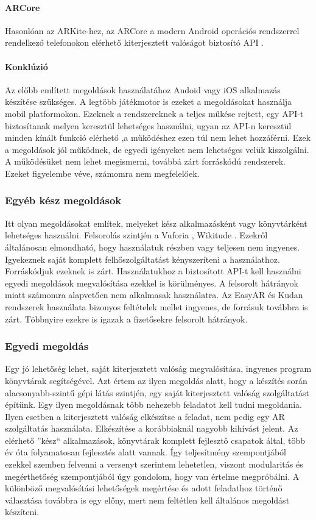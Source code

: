 \documentclass[12pt,a4paper,oneside]{report} %
\begin{document}
\paragraph{ARCore}
Hasonlóan az ARKite-hez, az ARCore a modern Android operációs rendszerrel rendelkező telefonokon elérhető kiterjesztett valóságot biztosító API \cite{arcore}.
\paragraph{Konklúzió}
Az előbb említett megoldások használatához Andoid vagy iOS alkalmazás készítése szükséges. A legtöbb játékmotor is ezeket a megoldásokat használja mobil platformokon. Ezeknek a rendszereknek a teljes műkése rejtett, egy API-t biztosítanak melyen keresztül lehetséges használni, ugyan az API-n keresztül minden kínált funkció elérhető ,a működéshez ezen túl nem lehet hozzáférni. Ezek a megoldások jól működnek, de egyedi igényeket nem lehetséges velük kiszolgálni. A működésüket nem lehet megismerni, továbbá zárt forráskódú rendszerek. Ezeket figyelembe véve, számomra nem megfelelőek.
\subsubsection{Egyéb kész megoldások}
Itt olyan megoldásokat említek, melyeket kész alkalmazásként vagy könyvtárként lehetséges használni. Felsorolás szintjén a Vuforia \cite{vuforia}, Wikitude \cite{wikitude}.
Ezekről általánosan elmondható, hogy használatuk részben vagy teljesen nem ingyenes. Igyekeznek saját komplett felhőszolgáltatást kényszeríteni a használathoz. Forráskódjuk ezeknek is zárt. Használatukhoz a biztosított API-t kell használni egyedi megoldások megvalósítása ezekkel is körülményes.  A felsorolt hátrányok miatt számomra alapvetően nem alkalmasak használatra.
Az EasyAR \cite{ezar} és Kudan \cite{kudan} rendszerek használata bizonyos feltételek mellet ingyenes, de forrásuk továbbra is zárt. Többnyire ezekre is igazak a  fizetősekre felsorolt hátrányok.

\subsubsection{Egyedi megoldás}
Egy jó lehetőség lehet, saját kiterjesztett valóság megvalósítása, ingyenes program könyvtárak segítségével.
Azt értem az ilyen megoldás alatt, hogy a készítés során alacsonyabb-szintű gépi látás szintjén, egy saját kiterjesztett valóság szolgáltatást építünk. Egy ilyen megoldásnak több nehezebb feladatot kell tudni megoldania. Ilyen esetben a kiterjesztett valóság elkészítse a feladat, nem pedig egy AR szolgáltatás használata. Elkészítése a korábbiaknál nagyobb kihívást jelent. Az elérhető ''kész`` alkalmazások, könyvtárak komplett fejlesztő csapatok által, több év óta folyamatosan fejlesztés alatt vannak. Így teljesítmény szempontjából ezekkel szemben felvenni a versenyt szerintem lehetetlen, viszont modularitás és megérthetőség szempontjából úgy gondolom, hogy van értelme megpróbálni. A különböző megvalósítási lehetőségek megértése és adott feladathoz történő választása továbbra is egy előny, mert nem feltétlen kell általános megoldást készíteni.
\end{document}

